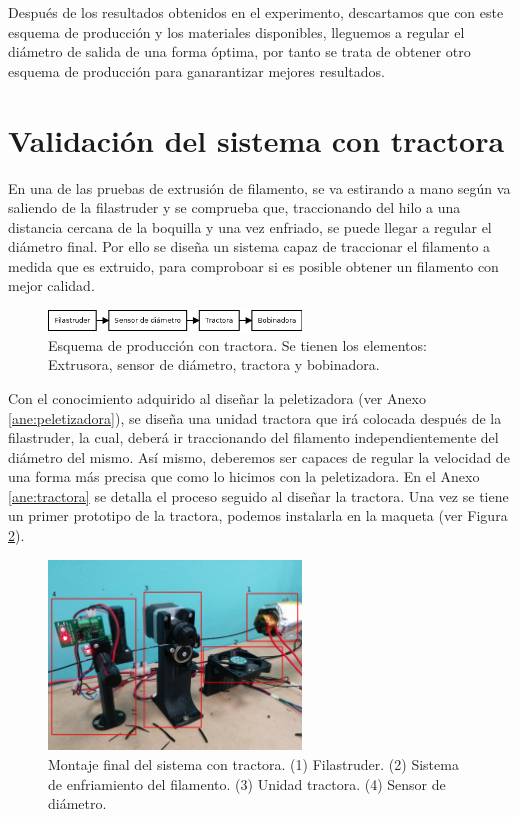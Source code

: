 Después de los resultados obtenidos en el experimento, descartamos que con este esquema de producción y los materiales disponibles, lleguemos a regular el diámetro de salida de una forma óptima, por tanto se trata de obtener otro esquema de producción para ganarantizar mejores resultados.

\section{Validación del sistema con tractora}
\label{sec:FST}

En una de las pruebas de extrusión de filamento, se va estirando a mano según va saliendo de la filastruder y se comprueba que, traccionando del hilo a una distancia cercana de la boquilla y una vez enfriado, se puede llegar a regular el diámetro final. Por ello se diseña un sistema capaz de traccionar el filamento a medida que es extruido, para comproboar si es posible obtener un filamento con mejor calidad.

\begin{figure}[H]
    \centering
    \includegraphics[width=0.6\textwidth]{images/producciones/Diagram2.png}
    \caption[Esquema de producción con tractora.]{Esquema de producción con tractora. Se tienen los elementos: Extrusora, sensor de diámetro, tractora y bobinadora.}
    \label{fig:esquemap_FST}
\end{figure}

Con el conocimiento adquirido al diseñar la peletizadora (ver Anexo \ref{ane:peletizadora}), se diseña una unidad tractora que irá colocada después de la filastruder, la cual, deberá ir traccionando del filamento independientemente del diámetro del mismo. Así mismo, deberemos ser capaces de regular la velocidad de una forma más precisa que como lo hicimos con la peletizadora. En el Anexo \ref{ane:tractora} se detalla el proceso seguido al diseñar la tractora. Una vez se tiene un primer prototipo de la tractora, podemos instalarla en la maqueta (ver Figura \ref{fig:montaje_final}).

\begin{figure}[H]
    \centering
    \includegraphics[width=0.6\textwidth]{images/producciones/tractora/IMG_20150709_130326.jpg}
    \caption[Montaje final del sistema con tractora.]{Montaje final del sistema con tractora. (1) Filastruder. (2) Sistema de enfriamiento del filamento. (3) Unidad tractora. (4) Sensor de diámetro.}
    \label{fig:montaje_final}
\end{figure}

